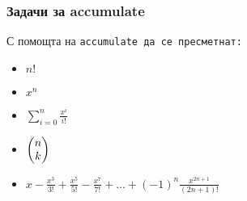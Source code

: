 \documentclass{beamer}
\begin{document}
\begin{frame}
  \frametitle{Задачи за accumulate}
  С помощта на \tt{accumulate} да се пресметнат:

  \begin{itemize}[<+->]
  \item $n!$
  \item $x^n$
  \item $\displaystyle\sum_{i=0}^n \frac{x^i}{i!}$
  \item $\displaystyle\left(\begin{array}{@{}c@{}}n\\k\end{array}\right)$
  \item $\displaystyle x - \frac{x^3}{3!} + \frac{x^5}{5!} - \frac{x^7}{7!} + \ldots + (-1)^n\frac{x^{2n+1}}{(2n+1)!}$
  \end{itemize}
\end{frame}
\end{document}
